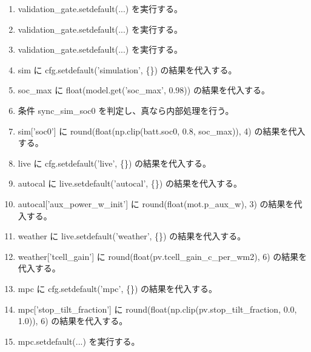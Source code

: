 \documentclass[a4paper,11pt]{article}
\begin{document}
\begin{enumerate}[leftmargin=1.8em]
\item validation\_gate.setdefault(...) を実行する。
\item validation\_gate.setdefault(...) を実行する。
\item validation\_gate.setdefault(...) を実行する。
\item sim に cfg.setdefault('simulation', \{\}) の結果を代入する。
\item soc\_max に float(model.get('soc\_max', 0.98)) の結果を代入する。
\item 条件 sync\_sim\_soc0 を判定し、真なら内部処理を行う。
\item   sim['soc0'] に round(float(np.clip(batt.soc0, 0.8, soc\_max)), 4) の結果を代入する。
\item live に cfg.setdefault('live', \{\}) の結果を代入する。
\item autocal に live.setdefault('autocal', \{\}) の結果を代入する。
\item autocal['aux\_power\_w\_init'] に round(float(mot.p\_aux\_w), 3) の結果を代入する。
\item weather に live.setdefault('weather', \{\}) の結果を代入する。
\item weather['tcell\_gain'] に round(float(pv.tcell\_gain\_c\_per\_wm2), 6) の結果を代入する。
\item mpc に cfg.setdefault('mpc', \{\}) の結果を代入する。
\item mpc['stop\_tilt\_fraction'] に round(float(np.clip(pv.stop\_tilt\_fraction, 0.0, 1.0)), 6) の結果を代入する。
\item mpc.setdefault(...) を実行する。
            \end{enumerate}
\end{document}
